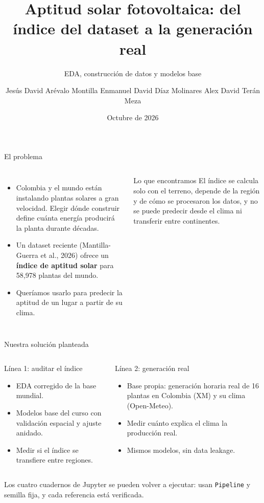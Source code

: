 \documentclass[aspectratio=169,10pt]{beamer}
\title[Aptitud solar y generación real]{Aptitud solar fotovoltaica: del índice del dataset a la generación real}
\subtitle{EDA, construcción de datos y modelos base}
\author{Jesús David Arévalo Montilla \quad Enmanuel David Díaz Molinares \quad Alex David Terán Meza}
\institute{Universidad del Norte \textbullet{} Pregrado en Ciencia de Datos\\Machine Learning \textbullet{} Profesor: Dr. Lihki Rubio}
\date{Octubre de 2026}
\begin{document}
\begin{frame}
  \titlepage
\end{frame}

\begin{frame}{El problema}
  \begin{columns}[T]
    \begin{itemize}
      \item Colombia y el mundo están instalando plantas solares a gran velocidad. Elegir \alert{dónde} construir define cuánta energía producirá la planta durante décadas.
      \item Un dataset reciente (Mantilla-Guerra et al., 2026) ofrece un \textbf{índice de aptitud solar} para 58,978 plantas del mundo.
      \item Queríamos usarlo para predecir la aptitud de un lugar a partir de su clima.
    \end{itemize}
    \begin{alertblock}{Lo que encontramos}
      El índice se calcula solo con el terreno, depende de la región y de cómo se procesaron los datos, y no se puede predecir desde el clima ni transferir entre continentes.
    \end{alertblock}
  \end{columns}
\end{frame}

\begin{frame}{Nuestra solución planteada}
  \begin{columns}[T]
    \begin{block}{Línea 1: auditar el índice}
      \begin{itemize}
        \item EDA corregido de la base mundial.
        \item Modelos base del curso con validación espacial y ajuste anidado.
        \item Medir si el índice se transfiere entre regiones.
      \end{itemize}
    \end{block}
    \begin{block}{Línea 2: generación real}
      \begin{itemize}
        \item Base propia: generación horaria real de 16 plantas en Colombia (XM) y su clima (Open-Meteo).
        \item Medir cuánto explica el clima la producción real.
        \item Mismos modelos, sin data leakage.
      \end{itemize}
    \end{block}
  \end{columns}
  \vspace{0.5em}
  \centering
  \small Los cuatro cuadernos de Jupyter se pueden volver a ejecutar: usan \texttt{Pipeline} y semilla fija, y cada referencia está verificada.
\end{frame}
\end{document}
